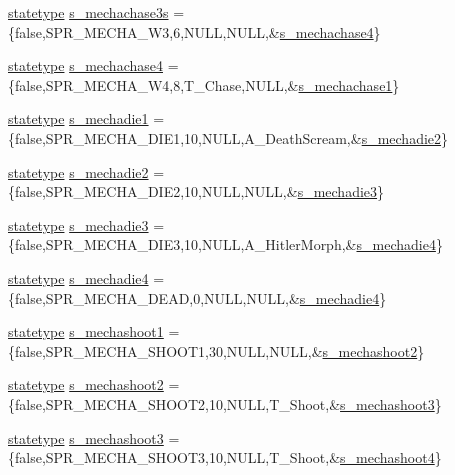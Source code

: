 \begin{DoxyCompactItemize}
\item 
\hyperlink{structstatestruct}{statetype} \hyperlink{WL__ACT2_8C_aaf123e2cfe781d241e08844abca78b78}{s\_\-mechachase3s} = \{false,SPR\_\-MECHA\_\-W3,6,NULL,NULL,\&\hyperlink{WL__ACT2_8C_af7f6b236427f2c8fb9849623a079fccd}{s\_\-mechachase4}\}
\item 
\hyperlink{structstatestruct}{statetype} \hyperlink{WL__ACT2_8C_af7f6b236427f2c8fb9849623a079fccd}{s\_\-mechachase4} = \{false,SPR\_\-MECHA\_\-W4,8,T\_\-Chase,NULL,\&\hyperlink{WL__DEF_8H_a7fd4292362075e6baaf13d0148e5c631}{s\_\-mechachase1}\}
\item 
\hyperlink{structstatestruct}{statetype} \hyperlink{WL__ACT2_8C_a6fb7dfa0612394dba59fa4d97134d19f}{s\_\-mechadie1} = \{false,SPR\_\-MECHA\_\-DIE1,10,NULL,A\_\-DeathScream,\&\hyperlink{WL__ACT2_8C_ab5221620a6d5d647bfadc8087fbe16a1}{s\_\-mechadie2}\}
\item 
\hyperlink{structstatestruct}{statetype} \hyperlink{WL__ACT2_8C_ab5221620a6d5d647bfadc8087fbe16a1}{s\_\-mechadie2} = \{false,SPR\_\-MECHA\_\-DIE2,10,NULL,NULL,\&\hyperlink{WL__ACT2_8C_a2c3b8a80ffcee5127812902c562d903f}{s\_\-mechadie3}\}
\item 
\hyperlink{structstatestruct}{statetype} \hyperlink{WL__ACT2_8C_a2c3b8a80ffcee5127812902c562d903f}{s\_\-mechadie3} = \{false,SPR\_\-MECHA\_\-DIE3,10,NULL,A\_\-HitlerMorph,\&\hyperlink{WL__ACT2_8C_ad5b5f331e922b78dcc8eec9b39b289fb}{s\_\-mechadie4}\}
\item 
\hyperlink{structstatestruct}{statetype} \hyperlink{WL__ACT2_8C_ad5b5f331e922b78dcc8eec9b39b289fb}{s\_\-mechadie4} = \{false,SPR\_\-MECHA\_\-DEAD,0,NULL,NULL,\&\hyperlink{WL__ACT2_8C_ad5b5f331e922b78dcc8eec9b39b289fb}{s\_\-mechadie4}\}
\item 
\hyperlink{structstatestruct}{statetype} \hyperlink{WL__ACT2_8C_a20a81b8449b704b6560857c79da7733c}{s\_\-mechashoot1} = \{false,SPR\_\-MECHA\_\-SHOOT1,30,NULL,NULL,\&\hyperlink{WL__ACT2_8C_a89cca9e88c397fa7dc6a073ddd2312de}{s\_\-mechashoot2}\}
\item 
\hyperlink{structstatestruct}{statetype} \hyperlink{WL__ACT2_8C_a89cca9e88c397fa7dc6a073ddd2312de}{s\_\-mechashoot2} = \{false,SPR\_\-MECHA\_\-SHOOT2,10,NULL,T\_\-Shoot,\&\hyperlink{WL__ACT2_8C_a6e953972964e0b9fdd5084c254f7b974}{s\_\-mechashoot3}\}
\item 
\hyperlink{structstatestruct}{statetype} \hyperlink{WL__ACT2_8C_a6e953972964e0b9fdd5084c254f7b974}{s\_\-mechashoot3} = \{false,SPR\_\-MECHA\_\-SHOOT3,10,NULL,T\_\-Shoot,\&\hyperlink{WL__ACT2_8C_a4ede11ddad980badf517d93bc02fd4d0}{s\_\-mechashoot4}\}

\end{DoxyCompactItemize}
